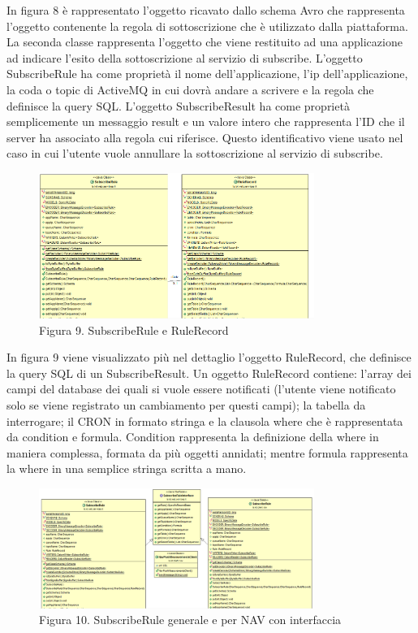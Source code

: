 In figura 8 è rappresentato l'oggetto ricavato dallo schema Avro che rappresenta l'oggetto contenente la regola di sottoscrizione che è utilizzato dalla piattaforma. La seconda classe rappresenta l’oggetto che viene restituito ad una applicazione ad indicare l’esito della sottoscrizione al servizio di subscribe. L’oggetto SubscribeRule ha come proprietà il nome dell’applicazione, l’ip dell’applicazione, la coda o topic di ActiveMQ in cui dovrà andare a scrivere e la regola che definisce la query SQL. L’oggetto SubscribeResult ha come proprietà semplicemente un messaggio result e un valore intero che rappresenta l’ID che il server ha associato alla regola cui riferisce. Questo identificativo viene usato nel caso in cui l’utente vuole annullare la sottoscrizione al servizio di subscribe.
\par \vspace*{2em}
\begin{figure}[h]
	\centering
	\includegraphics[width=0.8\textwidth]{rule-record.png}
	\caption*{Figura 9. SubscribeRule e RuleRecord}
\end{figure}
In figura 9 viene visualizzato più nel dettaglio l'oggetto RuleRecord, che definisce la query SQL di un SubscribeResult.
Un oggetto RuleRecord contiene: l’array dei campi del database dei quali si vuole essere notificati (l’utente viene notificato solo se viene registrato un cambiamento per questi campi); la tabella da interrogare; il CRON in formato stringa e la clausola where che è rappresentata da condition e formula. Condition rappresenta la definizione della where in maniera complessa, formata da più oggetti annidati; mentre formula rappresenta la where in una semplice stringa scritta a mano. 
\par \vspace*{2em}
\begin{figure}[h]
	\centering
	\includegraphics[width=0.8\textwidth]{rules.png}
	\caption*{Figura 10. SubscribeRule generale e per NAV con interfaccia}
\end{figure}
